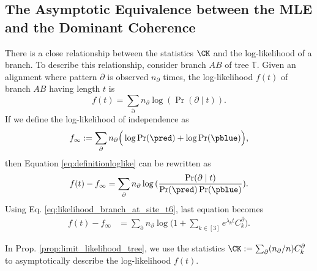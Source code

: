 \begin{appendices}
\clearpage 


\section{The Asymptotic Equivalence between the MLE and the Dominant Coherence
}
\label{sec:asym_phylo_tree}

There is a close relationship between the statistics $\CK$ and the log-likelihood of a branch. To describe this relationship, consider branch $AB$ of tree $\mathbb{T}$. Given an alignment where pattern $\partial$ is observed $n_\partial$ times, the log-likelihood $f(t)$ of branch $AB$ having length $t$ is
\begin{equation}\label{eq:definitionloglike}
f(t) = 
\sum_\partial n_\partial \log{(\Pr(\partial \mid t))}.
\end{equation}
If we define the log-likelihood of independence as 
 \begin{equation} \label{eq:DIFLoglikelihood}
 {f_\infty := \sum_\partial n_\partial \Big(\log\Pr(\pred)+  \log\Pr(\pblue)\Big)}, 
 \end{equation}
 then Equation \ref{eq:definitionloglike} can be rewritten as 
\begin{equation}\label{eq:definitionloglike2}
f(t) -f_\infty= 
\sum_\partial n_\partial \log{(\frac{\Pr(\partial \mid t)}{\Pr(\pred)\Pr(\pblue)})}.
\end{equation}
    Using Eq. \ref{eq:likelihood_branch_at_site_t6}, last equation becomes
 \begin{align} 
     \label{eq:efficient_likelihood_2}
     f(t)-f_\infty &=  \sum_{\partial} n_\partial \log \Big( 1+  \sum_{k \in [3]} e^{\lambda_kt}  C_k^\partial\Big).
 \end{align} 
 
In Prop. \ref{prop:limit_likelihood_tree},  we use the statistics $\CK:= \sum_\partial (n_{\partial}/n) C_k^\partial$ to asymptotically describe the log-likelihood $f(t)$. 
 

\end{appendices}
